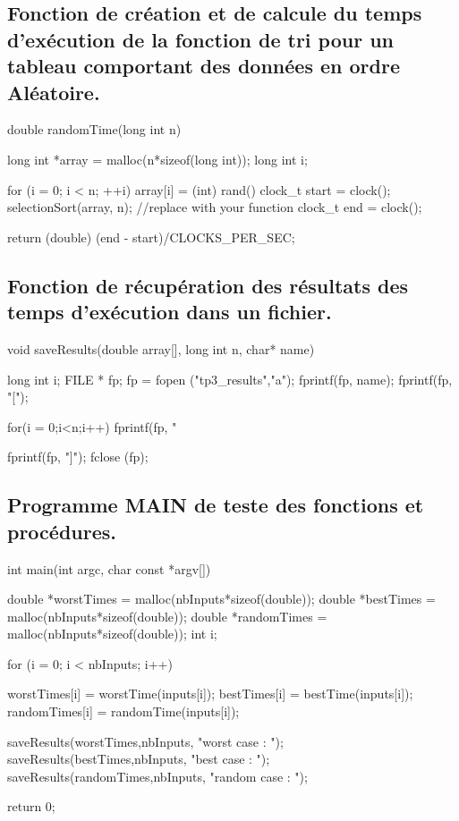 \documentclass[12pt]{article}
\begin{document}
\subsection{Fonction de création et de calcule du temps d'exécution de la fonction de tri pour un tableau comportant des données en ordre Aléatoire.}
\begin{sql}
double randomTime(long int n) {
    
  long int *array = malloc(n*sizeof(long int));
  long int i;
  
  for (i = 0; i < n; ++i)
  {
    array[i] = (int) rand()%
  }
  clock_t start = clock();
  selectionSort(array, n); //replace with your function 
  clock_t end = clock();

  return (double) (end - start)/CLOCKS_PER_SEC;
}
\end{sql}

\subsection{Fonction de récupération des résultats des temps d'exécution dans un fichier.}
\begin{sql}
  void saveResults(double array[], long int n, char* name) {

     long int i;
     FILE * fp;
     fp = fopen ("tp3_results","a");
     fprintf(fp, name);
     fprintf(fp, "[");

     for(i = 0;i<n;i++) {
      fprintf(fp, "%
     }

     fprintf(fp, "]\n");
     fclose (fp);
  }
\end{sql}

\subsection{Programme MAIN de teste des fonctions et procédures.}
\begin{sql}
int main(int argc, char const *argv[])
{
	double *worstTimes = malloc(nbInputs*sizeof(double));
	double *bestTimes = malloc(nbInputs*sizeof(double));
	double *randomTimes = malloc(nbInputs*sizeof(double));
	int i;

	for (i = 0; i < nbInputs; i++)
	{
		worstTimes[i] = worstTime(inputs[i]);
		bestTimes[i] = bestTime(inputs[i]);
		randomTimes[i] = randomTime(inputs[i]);

	}

	saveResults(worstTimes,nbInputs, "worst case : ");
	saveResults(bestTimes,nbInputs, "best case : ");
	saveResults(randomTimes,nbInputs, "random case : ");

	return 0;
}

\end{sql}
\end{document}
